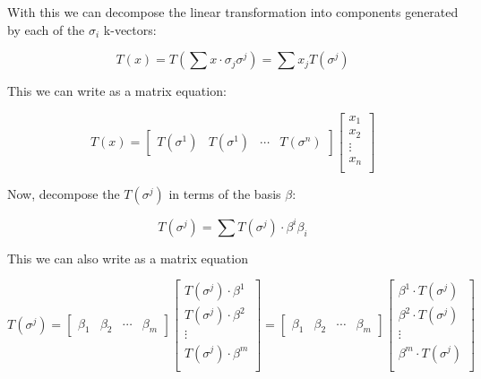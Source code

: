 With this we can decompose the linear transformation into components generated by each of the $\sigma_i$ k-vectors:

\begin{equation}
T(x) = T(\sum x \cdot \sigma_j \sigma^j) = \sum x_j T(\sigma^j)
\end{equation}

This we can write as a matrix equation:

\begin{equation}
T(x) = 
\begin{bmatrix}
T(\sigma^1) & T(\sigma^1) & \cdots & T(\sigma^n)
\end{bmatrix}
\begin{bmatrix}
x_1 \\
x_2 \\
\vdots \\
x_n \\
\end{bmatrix}
\end{equation}

Now, decompose the $T(\sigma^j)$ in terms of the basis $\beta$:

\begin{equation}
T(\sigma^j) = \sum T(\sigma^j) \cdot \beta^i \beta_i
\end{equation}

This we can also write as a matrix equation

\begin{equation}
T(\sigma^j) = 
\begin{bmatrix}
\beta_1 & \beta_2 & \cdots & \beta_m
\end{bmatrix}
\begin{bmatrix}
T(\sigma^j) \cdot \beta^1 \\
T(\sigma^j) \cdot \beta^2 \\
\vdots \\
T(\sigma^j) \cdot \beta^m \\
\end{bmatrix}
=
\begin{bmatrix}
\beta_1 & \beta_2 & \cdots & \beta_m
\end{bmatrix}
\begin{bmatrix}
\beta^1 \cdot T(\sigma^j) \\
\beta^2 \cdot T(\sigma^j) \\
\vdots \\
\beta^m \cdot T(\sigma^j) \\
\end{bmatrix}
\end{equation}

